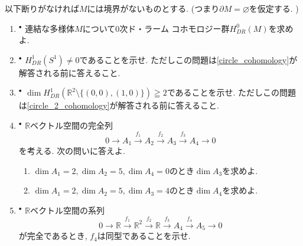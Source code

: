 \documentclass[dvipdfmx,a4paper,11pt]{article}
\newcommand{\R}{\mathbb{R}}
\theoremstyle{definition}
\begin{document}
以下断りがなければ$M$には境界がないものとする. (つまり$\partial M = \varnothing$を仮定する. )
\vspace{11pt}
\begin{enumerate}[label=\textbf{問}\ref*{sec-deRham}.\arabic*]

\item  $^\bullet$ 連結な多様体$M$について0次ド・ラーム コホモロジー群$H^{0}_{DR}(M)$を求めよ. 


\item $^\bullet$ $H^{1}_{DR}(S^1) \neq 0$であることを示せ. ただしこの問題は\ref{circle_cohomology}が解答される前に答えること. 

\item $^\bullet$ $\dim H^{1}_{DR}(\R^2 \setminus \{(0,0) , (1,0)\} ) \geqq 2$であることを示せ. ただしこの問題は\ref{circle_2_cohomology}が解答される前に答えること. 

\item $^\bullet$ $\R$ベクトル空間の完全列
  $$
0 \to A_1 \stackrel{f_1}{\to} A_2 \stackrel{f_2}{\to} A_3\stackrel{f_3}{\to} A_4  \to 0
  $$
  を考える. 次の問いに答えよ. 
\begin{enumerate}
 \setlength{\parskip}{0cm}
  \setlength{\itemsep}{2pt}
  \item 
  $\dim A_1 =2, \dim A_2=5, \dim A_4=0$のとき$\dim A_3$を求めよ. 
    \item %
  $\dim A_1 =2, \dim A_2=5, \dim A_3=4$のとき$\dim A_4$を求めよ. 
  \end{enumerate}
  \newpage 
 \item $^\bullet$
    $\R$ベクトル空間の系列
  $$
0 \to \R \stackrel{f_1}{\to} \R^2 \stackrel{f_2}{\to} \R \stackrel{f_3}{\to} A_4 \stackrel{f_4}{\to} A_5 \to 0
  $$
が完全であるとき, $f_4$は同型であることを示せ. 
  

\end{enumerate}
\end{document}
